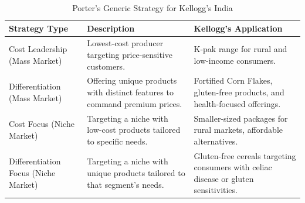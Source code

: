 \documentclass[10pt,a4paper]{book}
\begin{document}
\begin{table}[H]
\centering
\begin{tabular}{|p{2.5cm}|p{8.5cm}|p{5.5cm}|}
\hline
\textbf{Strategy Type} & \textbf{Description} & \textbf{Kellogg's Application} \\ \hline
Cost Leadership (Mass Market) & Lowest-cost producer targeting price-sensitive customers. & K-pak range for rural and low-income consumers. \\ \hline
Differentiation (Mass Market) & Offering unique products with distinct features to command premium prices. & Fortified Corn Flakes, gluten-free products, and health-focused offerings. \\ \hline
Cost Focus (Niche Market) & Targeting a niche with low-cost products tailored to specific needs. & Smaller-sized packages for rural markets, affordable alternatives. \\ \hline
Differentiation Focus (Niche Market) & Targeting a niche with unique products tailored to that segment’s needs. & Gluten-free cereals targeting consumers with celiac disease or gluten sensitivities. \\ \hline
\end{tabular}
\caption{Porter’s Generic Strategy for Kellogg’s India}
\end{table}

\vspace{0.5cm}

\clearpage
\end{document}
